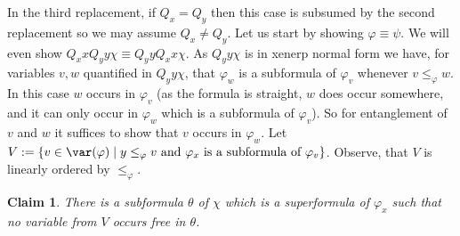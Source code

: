 \documentclass{LMCS}
\newtheorem{clam}{Claim}
\renewcommand{\phi}{\varphi}
\begin{document}
In the third replacement, 
if $Q_x=Q_y$ then this case is subsumed by the second replacement 
so we may assume $Q_x\not=Q_y$. 
Let us start by showing $\phi\equiv\psi$. 
We will even show $Q_xxQ_yy\chi\equiv Q_yyQ_xx\chi$. 
As $Q_yy\chi$ is in xenerp normal form we have, 
for variables $v,w$ quantified in $Q_yy\chi$,
that $\phi_w$ is a subformula of $\phi_v$ whenever $v\leq_{\phi}w$. 
  In this case $w$ occurs in $\phi_v$ 
  (as the formula is straight, $w$ does occur somewhere, 
  and it can only occur in $\phi_w$ which is a subformula of $\phi_v$). 
So for entanglement of $v$ and $w$ 
it suffices to show that $v$ occurs in $\phi_w$. 
Let $V:=\{v\in \var(\phi)\mid  y\leq_{\phi}v\text{ and }\phi_x\text{ is a subformula of }
\phi_v\}$. 
Observe, that $V$ is linearly ordered by $\leq_{\phi}$.

\begin{clam}
There is a subformula $\theta$ of $\chi$ 
which is a superformula of $\phi_x$ 
such that no variable from $V$ occurs free in $\theta$. 
\end{clam}
\end{document}
